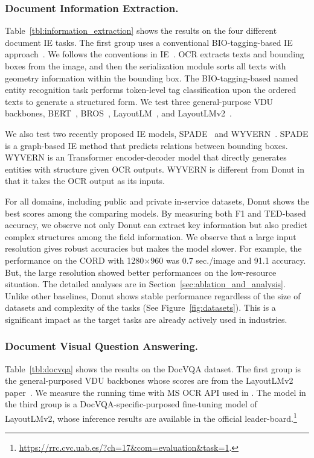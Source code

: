\documentclass[runningheads]{llncs}
\newcommand\ours{{{\mbox{Donut}}}\xspace}
\begin{document}
\subsubsection{Document Information Extraction.}

Table~\ref{tbl:information_extraction} shows the results on the four different document IE tasks.
The first group uses a conventional BIO-tagging-based IE approach~\cite{hwang2019pot}. We follows the conventions in IE~\cite{xu2019_layoutLM,hong2021bros}. OCR extracts texts and bounding boxes from the image, and then the serialization module sorts all texts with geometry information within the bounding box. The BIO-tagging-based named entity recognition task performs token-level tag classification upon the ordered texts to generate a structured form. We test three general-purpose VDU backbones, BERT~\cite{devlinBERT2018}, BROS~\cite{hong2021bros}, LayoutLM~\cite{xu2019_layoutLM}, and LayoutLMv2~\cite{xu-etal-2021-layoutlmv2,layoutxlm}.

We also test two recently proposed IE models, SPADE~\cite{hwang2020spade} and WYVERN~\cite{hwang2021costeffective}. SPADE is a graph-based IE method that predicts relations between bounding boxes. WYVERN is an Transformer encoder-decoder model that directly generates entities with structure given OCR outputs. WYVERN is different from \ours in that it takes the OCR output as its inputs.

For all domains, including public and private in-service datasets, \ours shows the best scores among the comparing models.
By measuring both F1 and TED-based accuracy, we observe not only \ours can extract key information but also predict complex structures among the field information.
We observe that a large input resolution gives robust accuracies but makes the model slower. For example, the performance on the CORD with 1280$\times$960 was 0.7 sec./image and 91.1 accuracy. But, the large resolution showed better performances on the low-resource situation. The detailed analyses are in Section~\ref{sec:ablation_and_analysis}.
Unlike other baselines, \ours shows stable performance regardless of the size of datasets and complexity of the tasks (See Figure~\ref{fig:datasets}). This is a significant impact as the target tasks are already actively used in industries.


\subsubsection{Document Visual Question Answering.}
Table~\ref{tbl:docvqa} shows the results on the DocVQA dataset.
The first group is the general-purposed VDU backbones whose scores are from the LayoutLMv2 paper~\cite{xu-etal-2021-layoutlmv2}.
We measure the running time with MS OCR API used in \cite{xu-etal-2021-layoutlmv2}.
The model in the third group is a DocVQA-specific-purposed fine-tuning model of LayoutLMv2, 
whose inference results are available in the official leader-board.\footnote{\url{https://rrc.cvc.uab.es/?ch=17&com=evaluation&task=1}.}
\end{document}
